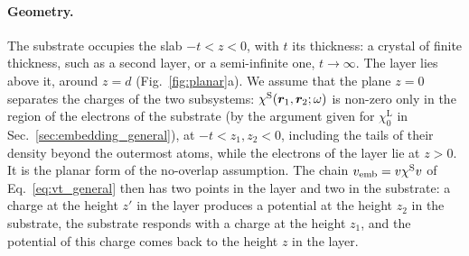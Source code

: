 \documentclass[10pt,a4paper]{paper}
\begin{document}
\paragraph{Geometry.} The substrate occupies the slab $-t < z < 0$, with $t$ its thickness: a crystal of finite
thickness, such as a second layer, or a semi-infinite one, $t \to \infty$. The layer lies above it, around $z = d$
(Fig.~\ref{fig:planar}a). We assume that the plane $z = 0$ separates the charges of the two subsystems:
$\chi^{\mathrm{S}}(\bm{r}_1,\bm{r}_2;\omega)$ is non-zero only in the region of the electrons of the substrate (by the argument
given for $\chi_0^{\mathrm{L}}$ in Sec.~\ref{sec:embedding_general}), at $-t < z_1, z_2 < 0$, including the tails of
their density beyond the outermost atoms, while the electrons of the layer lie at $z > 0$. It is the planar form of the no-overlap assumption. The chain $v_{\mathrm{emb}} = v\chi^{\mathrm{S}} v$ of
Eq.~\eqref{eq:vt_general} then has two points in the layer and two in the substrate: a charge at the height $z'$ in the
layer produces a potential at the height $z_2$ in the substrate, the substrate responds with a charge at the height
$z_1$, and the potential of this charge comes back to the height $z$ in the layer.
\end{document}
